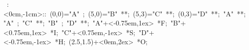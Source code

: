 

\hbox{
\xy    <1cm,0cm>:<0cm,-1cm>::
       (0,0)="A" ; (5,0)="B" **\dir{-}; 
       (5,3)="C" **\dir{-}; (0,3)="D" **\dir{-}; 
       "A" **\dir{-}; "A" ; "C" **\dir{-}; 
       "B" ; "D" **\dir{-};
       "A"+<-0.75em,1ex> *{F};
       "B"+<0.75em,1ex> *{I};
       "C"+<0.75em,-1ex> *{S};
       "D"+<-0.75em,-1ex> *{H};
       (2.5,1.5)+<0em,2ex> *{O};
       \endxy}
	   
